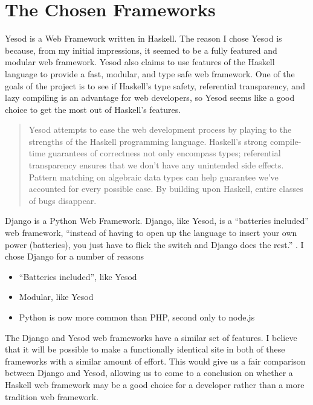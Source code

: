 \section{The Chosen Frameworks}

Yesod is a Web Framework written in Haskell. The reason I chose Yesod is because, from my initial impressions, it seemed to be a fully featured and modular web framework. Yesod also claims to use features of the Haskell language to provide a fast, modular, and type safe web framework. One of the goals of the project is to see if Haskell's type safety, referential transparency, and lazy compiling is an advantage for web developers, so Yesod seems like a good choice to get the most out of Haskell's features.

\begin{quote}
Yesod attempts to ease the web development process by playing to the strengths of the Haskell programming language. Haskell’s strong compile-time guarantees of correctness not only encompass types; referential transparency ensures that we don’t have any unintended side effects. Pattern matching on algebraic data types can help guarantee we’ve accounted for every possible case. By building upon Haskell, entire classes of bugs disappear. \parencite[Introduction]{yesodBook}
\end{quote}

Django is a Python Web Framework. Django, like Yesod, is a ``batteries included'' web framework, ``instead of having to open up the language to insert your own power (batteries), you just have to flick the switch and Django does the rest.'' \parencite{djangoBookReasons}. I chose Django for a number of reasons

\begin{itemize}
  \item ``Batteries included'', like Yesod
  \item Modular, like Yesod
  \item Python is now more common than PHP, second only to node.js \parencite{djangoBookReasons}
\end{itemize}

The Django and Yesod web frameworks have a similar set of features. I believe that it will be possible to make a functionally identical site in both of these frameworks with a similar amount of effort. This would give us a fair comparison between Django and Yesod, allowing us to come to a conclusion on whether a Haskell web framework may be a good choice for a developer rather than a more tradition web framework.
